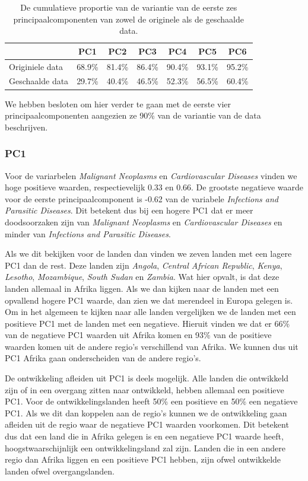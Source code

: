 \documentclass[a4paper,kulak]{kulakarticle}
\begin{document}
\begin{table}[ht]
	\centering
\begin{tabular}{lcccccc}
	\hline 
	& PC1 & PC2 & PC3 & PC4 & PC5 & PC6 \\ 
	\hline 
	Originiele data & 68.9\% & 81.4\% & 86.4\% & 90.4\% & 93.1\% & 95.2\% \\ 
	Geschaalde data & 29.7\% & 40.4\% & 46.5\% & 52.3\% & 56.5\% & 60.4\%\\ 
	\hline 
\end{tabular} 
\caption{De cumulatieve proportie van de variantie van de eerste zes principaalcomponenten van zowel de originele als de geschaalde data.}
\label{table:pcaScaledVSNot}
\end{table}

We hebben besloten om hier verder te gaan met de eerste vier principaalcomponenten aangezien ze 90\% van de variantie van de data beschrijven. 

\subsubsection*{PC1}
Voor de variarbelen \textit{Malignant Neoplasms} en \textit{Cardiovascular Diseases} vinden we hoge positieve waarden, respectievelijk 0.33 en 0.66. De grootste negatieve waarde voor de eerste principaalcomponent is -0.62 van de variabele \textit{Infections and Parasitic Diseases}. Dit betekent dus bij een hogere PC1 dat er meer doodsoorzaken zijn van \textit{Malignant Neoplasms} en \textit{Cardiovascular Diseases} en minder van \textit{Infections and Parasitic Diseases}. 

Als we dit bekijken voor de landen dan vinden we zeven landen met een lagere PC1 dan de rest. Deze landen zijn \textit{Angola}, \textit{Central African Republic}, \textit{Kenya}, \textit{Lesotho}, \textit{Mozambique}, \textit{South Sudan} en \textit{Zambia}. Wat hier opvalt, is dat deze landen allemaal in Afrika liggen. Als we dan kijken naar de landen met een opvallend hogere PC1 waarde, dan zien we dat merendeel in Europa gelegen is. Om in het algemeen te kijken naar alle landen vergelijken we de landen met een positieve PC1 met de landen met een negatieve. Hieruit vinden we dat er 66\% van de negatieve PC1 waarden uit Afrika komen en 93\% van de positieve waarden komen uit de andere regio's verschillend van Afrika. We kunnen dus uit PC1 Afrika gaan onderscheiden van de andere regio's.

De ontwikkeling afleiden uit PC1 is deels mogelijk. Alle landen die ontwikkeld zijn of in een overgang zitten naar ontwikkeld, hebben allemaal een positieve PC1. Voor de ontwikkelingslanden heeft 50\% een positieve en 50\% een negatieve PC1. Als we dit dan koppelen aan de regio's kunnen we de ontwikkeling gaan afleiden uit de regio waar de negatieve PC1 waarden voorkomen. Dit betekent dus dat een land die in Afrika gelegen is en een negatieve PC1 waarde heeft, hoogstwaarschijnlijk een ontwikkelingsland zal zijn. Landen die in een andere regio dan Afrika liggen en een positieve PC1 hebben, zijn ofwel ontwikkelde landen ofwel overgangslanden. 
\end{document}
